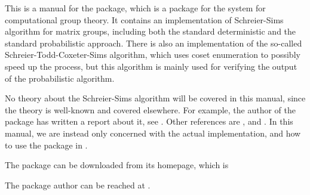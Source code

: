 

This is a manual for the {\matrixss} package, which is a
package for the {\GAP} system for computational group theory. It
contains an implementation of Schreier-Sims algorithm for matrix
groups, including both the standard deterministic and the standard
probabilistic approach. There is also an implementation of the
so-called Schreier-Todd-Coxeter-Sims algorithm, which uses coset
enumeration to possibly speed up the process, but this algorithm is
mainly used for verifying the output of the probabilistic algorithm.

No theory about the Schreier-Sims algorithm will be covered in this
manual, since the theory is well-known and covered elsewhere. For
example, the author of the package has written a report about it, see
\cite{baarnhielm04}. Other references are \cite{butler91},
\cite{soicher98} and \cite{seress03}. In this manual, we are instead only
concerned with the actual implementation, and how to use the package
in {\GAP}.

The package can be downloaded from its homepage, which is 

The package author can be reached at .

